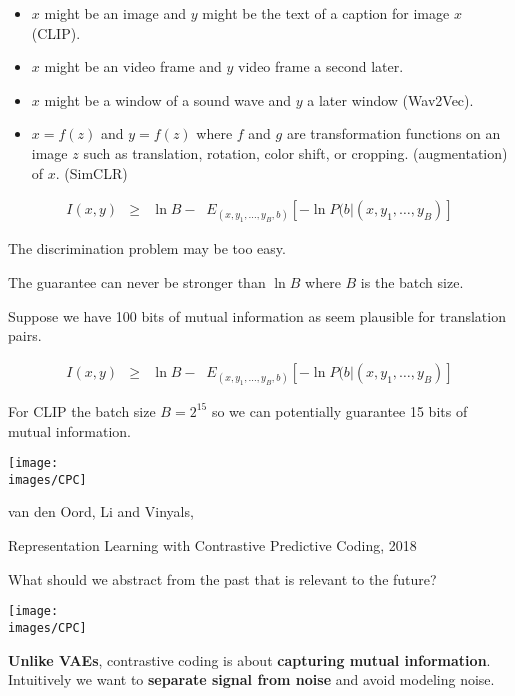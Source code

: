 { \vfill
\begin{itemize}
\item $x$ might be an image and $y$ might be the text of a caption for image $x$ (CLIP).

\vfill
\item $x$ might be an video frame and $y$ video frame a second later.

\vfill
\item $x$ might be a window of a sound wave and $y$ a later window (Wav2Vec).

\vfill
\item $x = f(z)$ and $y = f(z)$ where $f$ and $g$ are transformation functions on an image $z$ such as  translation, rotation, color shift, or cropping. (augmentation) of $x$. (SimCLR)
\end{itemize}



{\huge
\begin{eqnarray*}
I(x,y) & \geq & \ln B - \;\;E_{(x,y_1,\ldots,y_B,b)}\left[-\ln P(b|(x,y_1,\ldots,y_B)\right]
\end{eqnarray*}
}

The discrimination problem may be too easy.

\vfill
The guarantee can never be stronger than $\ln B$ where $B$ is the batch size.

\vfill
Suppose we have 100 bits of mutual information as seem plausible for translation pairs.


\begin{eqnarray*}
I(x,y) & \geq & \ln B - \;\;E_{(x,y_1,\ldots,y_B,b)}\left[-\ln P(b|(x,y_1,\ldots,y_B)\right]
\end{eqnarray*}

\vfill
For CLIP the batch size $B = 2^{15}$ so we can potentially guarantee 15 bits of mutual information.


\centerline{\texttt{[image: \\images/CPC]}}
\centerline{\huge van den Oord, Li and Vinyals,}
\centerline{\huge Representation Learning with Contrastive Predictive Coding, 2018}

\vfill
What should we abstract from the past that is relevant to the future?

\centerline{\texttt{[image: \\images/CPC]}}

\vfill
{\bf Unlike VAEs}, contrastive coding is about {\bf capturing mutual information}.
Intuitively we want to {\bf separate signal from noise} and avoid modeling noise.

}
